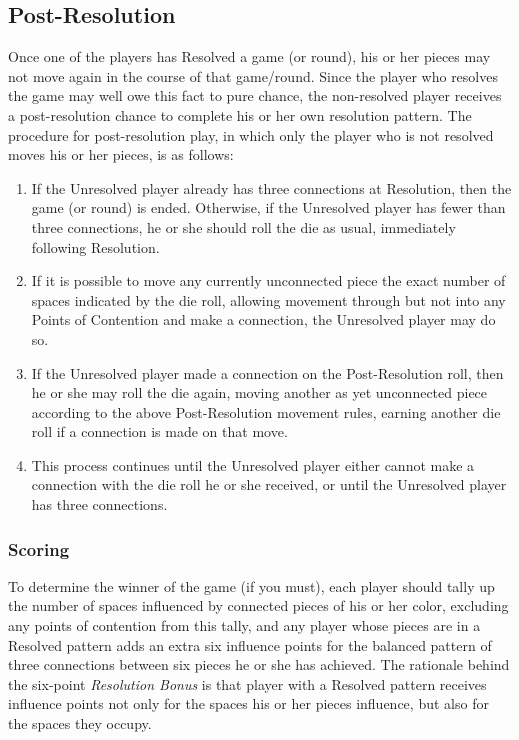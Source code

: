 \subsection{Post-Resolution}\label{postres}

Once one of the players has Resolved a game (or round), his or her pieces may
not move again in the course of that game/round.  Since the player who resolves
the game may well owe this fact to pure chance, the non-resolved player receives
a post-resolution chance to complete his or her own resolution pattern.
The procedure for post-resolution play, in which only the player who is not resolved
moves his or her pieces, is as follows:

\begin{enumerate}
  \item
    If the Unresolved player already has three connections at Resolution, then the
    game (or round) is ended.  Otherwise, if the Unresolved player has fewer than
    three connections, he or she should roll the die as usual, immediately following
    Resolution.

  \item
    If it is possible to move any currently unconnected piece the exact number
    of spaces indicated by the die roll, allowing movement through but not into
    any Points of Contention and make a connection, the Unresolved player may do
    so.

  \item
    If the Unresolved player made a connection on the Post-Resolution roll, then he or she
    may roll the die again, moving another as yet unconnected piece according to the
    above Post-Resolution movement rules, earning another die roll if a connection
    is made on that move.

  \item
    This process continues until the Unresolved player either
    cannot make a connection with the die roll he or she received, or until the
    Unresolved player has three connections.
\end{enumerate}

\subsubsection{Scoring}\label{scoring}
  To determine the winner of the game (if you must), each player should tally up
  the number of spaces influenced by connected pieces of his or her color, excluding
  any points of contention from this tally, and any player whose pieces are in a Resolved
  pattern adds an extra six influence points for the balanced pattern of three connections
  between six pieces he or she has achieved.  The rationale behind the six-point
  {\sl Resolution Bonus} is that player
  with a Resolved pattern receives influence points not only for the spaces his or her
  pieces influence, but also for the spaces they occupy.

